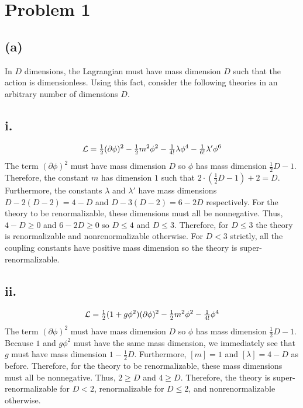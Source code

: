 \documentclass[12pt]{article}
\begin{document}

\section*{Problem 1}
\subsection*{(a)}
In $D$ dimensions, the Lagrangian must have mass dimension $D$ such that the action is dimensionless. Using this fact,
consider the following theories in an arbitrary number of dimensions $D$. 

\subsection*{i.}
\[ \mathcal{L} = \tfrac{1}{2} (\partial \phi)^2 - \tfrac{1}{2} m^2 \phi^2 - \tfrac{1}{4!} \lambda \phi^4 - \tfrac{1}{6!} \lambda' \phi^6 \]
The term $(\partial \phi)^2$ must have mass dimension $D$ so $\phi$ has mass dimension $\tfrac{1}{2} D - 1$. Therefore, the constant $m$ has dimension $1$ such that $2 \cdot (\tfrac{1}{2} D - 1) + 2 = D$. Furthermore, the constants $\lambda$ and $\lambda'$ have mass dimensions $D - 2 (D - 2) = 4 - D$ and $D - 3 (D - 2) = 6 - 2 D$ respectively. For the theory to be renormalizable, these dimensions must all be nonnegative. Thus, $4 - D \ge 0$ and $6 - 2 D \ge 0$ so $D \le 4$ and $D \le 3$. Therefore, for $D \le 3$ the theory is renormalizable and nonrenormalizable otherwise. For $D < 3$ strictly, all the coupling constants have positive mass dimension so the theory is super-renormalizable. 

\subsection*{ii.}

\[ \mathcal{L} = \tfrac{1}{2} (1 + g \phi^2) (\partial \phi)^2 - \tfrac{1}{2} m^2 \phi^2 - \tfrac{1}{4!} \phi^4 \]
The term $(\partial \phi)^2$ must have mass dimension $D$ so $\phi$ has mass dimension $\tfrac{1}{2}D - 1$. Because $1$ and $g \phi^2$ must have the same mass dimension, we immediately see that $g$ must have mass dimension $1 - \tfrac{1}{2} D$. Furthermore, $[m] = 1$ and $[\lambda] = 4 - D$ as before. Therefore, for the theory to be renormalizable, these mass dimensions must all be nonnegative. Thus, $2 \ge D$ and $4 \ge D$. Therefore, the theory is super-renormalizable for $D < 2$, renormalizable for $D \le 2$, and nonrenormalizable otherwise. 
\end{document}
